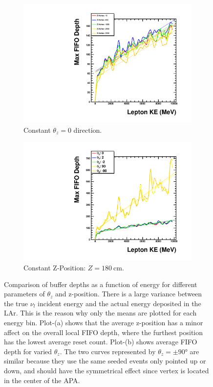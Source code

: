 \begin{figure}
\centering
\begin{subfigure}{.5\textwidth}
  \centering
  \includegraphics[width=\textwidth]{images/Const_Theta0_ASIC_lepKE_multigraph_pdg12_fhc.pdf}
  \caption{Constant $\theta_{z} = 0$ direction.}
\end{subfigure}%
\begin{subfigure}{.5\textwidth}
  \centering
  \includegraphics[width=\textwidth]{images/Const_Z180_ASIC_lepKE_multigraph_pdg12_fhc.pdf}
  \caption{Constant Z-Position: $Z = 180~$\unit{cm}.}
\end{subfigure}
\caption{Comparison of buffer depths as a function of energy for different parameters of $\theta_{z}$ and z-position.
There is a large variance between the true $\nu_{l}$ incident energy and the actual energy deposited in the LAr.
This is the reason why only the means are plotted for each energy bin.
Plot-(a) shows that the average z-position has a minor affect on the overall local FIFO depth, where the furthest position has the lowest average reset count.
Plot-(b) shows average FIFO depth for varied $\theta_{z}$.
The two curves represented by $\theta_{z} = \pm 90\unit{\degree}$ are similar because they use the same seeded events only pointed up or down, and should have the symmetrical effect since vertex is located in the center of the APA.
}
\label{fig:example_asic_energy_comparison}
\end{figure}

